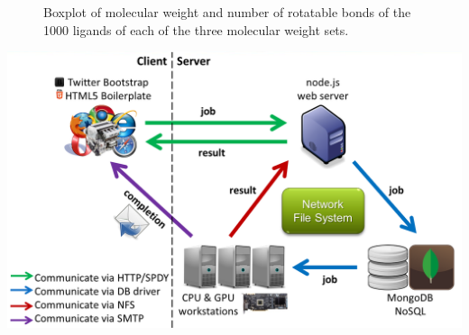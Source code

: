\documentclass[12pt]{article}
\begin{document}
\begin{figure}
\caption{\label{MWT-NRB} Boxplot of molecular weight and number of rotatable bonds of the 1000 ligands of each of the three molecular weight sets.}
\end{figure}





\clearpage

\begin{center}
\includegraphics[width=\linewidth,keepaspectratio=true]{Architecture.png}
\end{center}

\clearpage
\end{document}
